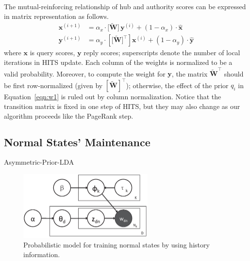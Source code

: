 \documentclass{sig-alternate-05-2015}
\begin{document}
The mutual-reinforcing relationship of hub and authority scores can be expressed in matrix representation as follows.
\begin{align}
\mathbf{x}^{(i+1)} &= \alpha_x\cdot \big[\tilde{\mathbf W}\big]\,\mathbf{y}^{(i)}+(1-\alpha_x)\cdot \hat{\mathbf{x}}\label{eqn:HITS2}\\
\mathbf{y}^{(i+1)} &= \alpha_y\cdot \left[\big[\tilde{\mathbf W}\big]^\top\right]\mathbf{x}^{(i)}+(1-\alpha_y)\cdot\hat{\mathbf{y}} \label{eqn:HITS1}
\end{align}
where $\mathbf x$ is query scores, $\mathbf y$ reply scores; superscripts denote the number of local iterations in HITS update.
Each column of the weights is normalized to be a valid probability. Moreover, to compute the weight for $\mathbf{y}$, the matrix $\mathbf{\tilde W}^\top$ should be first row-normalized (given by $[\mathbf{\tilde W}]^\top$); otherwise, the effect of the prior $q_i$ in Equation~\ref{eqn:w1} is ruled out by column normalization.
Notice that the transition matrix is fixed in one step of HITS, but they may also change as our algorithm proceeds like the PageRank step. 

\subsection{Normal States' Maintenance}
Asymmetric-Prior-LDA
\begin{figure}[t]
    \centering
    \includegraphics[height=3.5cm]{img/NTS.eps}
    \caption{Probabilistic model for training normal states by using history information.}
    \label{fig:cnn}
\end{figure}
\end{document}
